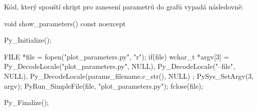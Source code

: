 Kód, který spouští skript pro zanesení parametrů do grafů vypadá následovně:
\begin{code}[fontsize=\footnotesize]
void show_parameters() const noexcept {
    Py_Initialize();

    FILE *file = fopen("plot_parameters.py", "r");
    if(file) {
        wchar_t *argv[3] = {
            Py_DecodeLocale("plot_parameters.py", NULL),
            Py_DecodeLocale("--file", NULL),
            Py_DecodeLocale(params_filename.c_str(), NULL)
        };
        PySys_SetArgv(3, argv);
        PyRun_SimpleFile(file, "plot_parameters.py");
        fclose(file);
    }

    Py_Finalize();
}
\end{code}






































